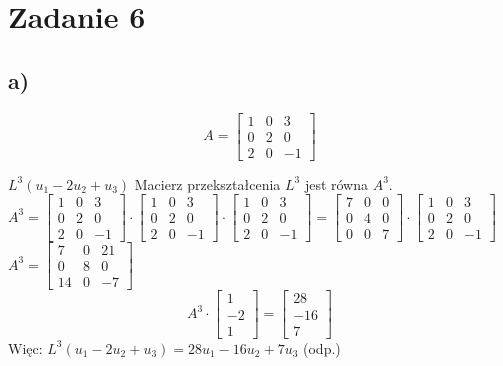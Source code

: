 \documentclass{article}
\begin{document}
\section{Zadanie 6}

\subsection{a)}

$$A = \left[\begin{array}{ccc}
1 & 0 & 3 \\
0 & 2 & 0 \\
2 & 0 & -1 \end{array}\right]$$

$L^{3}(u_{1}-2u_{2}+u_{3})$ \newline \newline
Macierz przekształcenia $L^{3}$ jest równa $A^{3}$. \newline \newline
$A^{3} = \left[\begin{array}{ccc}
1 & 0 & 3 \\
0 & 2 & 0 \\
2 & 0 & -1 \end{array}\right] \cdot \left[\begin{array}{ccc}
1 & 0 & 3 \\
0 & 2 & 0 \\
2 & 0 & -1 \end{array}\right] \cdot \left[\begin{array}{ccc}
1 & 0 & 3 \\
0 & 2 & 0 \\
2 & 0 & -1 \end{array}\right] = \left[\begin{array}{ccc}
7 & 0 & 0 \\
0 & 4 & 0 \\
0 & 0 & 7 \end{array}\right] \cdot \left[\begin{array}{ccc}
1 & 0 & 3 \\
0 & 2 & 0 \\
2 & 0 & -1 \end{array}\right]$ 
$A^{3} = \left[\begin{array}{ccc}
7 & 0 & 21 \\
0 & 8 & 0 \\
14 & 0 & -7 \end{array}\right]$ \newline \newline
$$A^{3} \cdot \left[\begin{array}{c}
1 \\
-2 \\
1 \end{array}\right] = \left[\begin{array}{ccc}
28 \\
-16\\
7  \end{array}\right]$$ \newline
Więc: $L^{3}(u_{1}-2u_{2}+u_{3}) = 28u_{1}-16u_{2}+7u_{3}$ (odp.)
\end{document}
